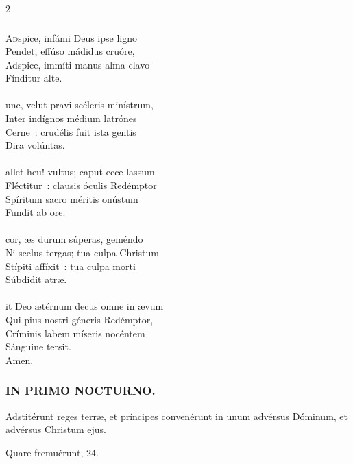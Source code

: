 \documentclass[9pt,twoside]{extarticle}
\begin{document}
\begin{multicols}{2}
\subsubsection*{\center{}}
\lettrine{A}dspice, infámi Deus ipse ligno\\
Pendet, effúso mádidus cruóre,\\
Adspice, immíti manus alma clavo\\
Fínditur alte.\\
\\
unc, velut pravi scéleris minístrum,\\
Inter indígnos médium latrónes\\
Cerne~: crudélis fuit ista gentis\\
Dira volúntas.\\
\\
allet heu! vultus; caput ecce lassum\\
Fléctitur~: clausis óculis Redémptor\\
Spíritum sacro méritis onústum\\
Fundit ab ore.\\
\\
 cor, æs durum súperas, geméndo\\
Ni scelus tergas; tua culpa Christum\\
Stípiti affíxit~: tua culpa morti\\
Súbdidit atræ.\\
\\
it Deo ætérnum decus omne in ævum\\
Qui pius nostri géneris Redémptor,\\
Críminis labem míseris nocéntem\\
Sánguine tersit.\\
Amen.

\subsubsection*{\center \textsc{IN PRIMO NOCTURNO.}}
\begin{tightlist}{}
\item {} Adstitérunt reges terræ, et príncipes convenérunt in unum advérsus Dóminum, et advérsus Christum ejus.
\item {} Quare fremuérunt, 24.
\end{tightlist}


\end{multicols}
\end{document}
